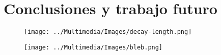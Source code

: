 \documentclass{beamer}
\begin{document}
\section{Conclusiones y trabajo futuro}

\begin{frame}
    \begin{figure}
        \centering
        \texttt{[image: ../Multimedia/Images/decay-length.png]}
    \end{figure}
\end{frame}

\begin{frame}
    \begin{figure}
        \centering
        \texttt{[image: ../Multimedia/Images/bleb.png]}
    \end{figure}
\end{frame}
\end{document}
